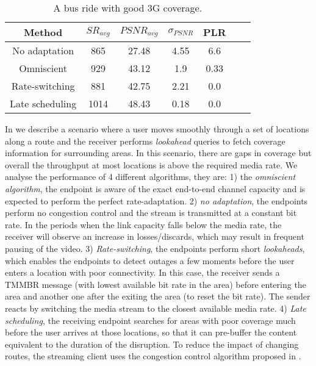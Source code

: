 \begin{table}
  \begin{center}
\begin{tabular}{ccccccc} \hline
Method & $SR_{avg}$ & $PSNR_{avg}$ & $\sigma_{PSNR}$ & PLR \\ \hline
No adaptation   & 865   & 27.48 & 4.55  & 6.6 \\
Omniscient      & 929   & 43.12 & 1.9   & 0.33 \\ 
Rate-switching  & 881   & 42.75 & 2.21  & 0.0  \\ 
Late scheduling & 1014  & 48.43 & 0.18 & 0.0  \\ \hline
\end{tabular}
\caption{A bus ride with good 3G coverage.}
\label{table-glass-sim7res}
\end{center}
\end{table}

In  we describe a scenario where a user moves smoothly
through a set of locations along a route and the receiver performs
\emph{lookahead} queries to fetch coverage information for surrounding areas.
In this scenario, there are gaps in coverage but overall the throughput at
most locations is above the required media rate. We analyse the performance of
4 different algorithms, they are: 1) the \emph{omniscient algorithm}, the
endpoint is aware of the exact end-to-end channel capacity and is expected to
perform the perfect rate-adaptation. 2) \emph{no adaptation}, the endpoints
perform no congestion control and the stream is transmitted at a constant bit
rate. In the periods when the link capacity falls below the media rate, the 
receiver will observe an increase in losses/discards, which may result in 
frequent pausing of the video. 3) \emph{Rate-switching}, the endpoints perform short
\emph{lookaheads}, which enables the endpoints to detect outages a few moments
before the user enters a location with poor connectivity. In this case, the
receiver sends a TMMBR message (with lowest available bit rate in the area)
before entering the area and another one after the exiting the area (to reset
the bit rate). The sender reacts by switching the media stream to the closest
available media rate. 4) \emph{Late scheduling}, the receiving endpoint
searches for areas with poor coverage much before the user arrives at those
locations, so that it can pre-buffer the content equivalent to the duration of
the disruption. To reduce the impact of changing routes, the streaming client
uses the congestion control algorithm proposed in .

